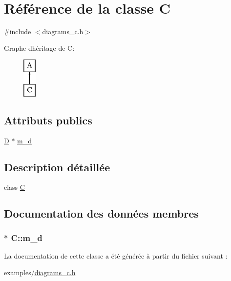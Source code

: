 \hypertarget{class_c}{}\section{Référence de la classe C}
\label{class_c}


{\ttfamily \#include $<$diagrams\+\_\+c.\+h$>$}

Graphe d\textquotesingle{}héritage de C\+:\begin{figure}[H]
\begin{center}
\leavevmode
\includegraphics[height=2.000000cm]{class_c}
\end{center}
\end{figure}
\subsection*{Attributs publics}
\begin{DoxyCompactItemize}
\item 
\hyperlink{class_d}{D} $\ast$ \hyperlink{class_c_a4ef972d28b73ff78eba3ab4f54c3b449}{m\+\_\+d}
\end{DoxyCompactItemize}


\subsection{Description détaillée}
class \hyperlink{class_c}{C} 

\subsection{Documentation des données membres}
\hypertarget{class_c_a4ef972d28b73ff78eba3ab4f54c3b449}{}
\subsubsection[{m\+\_\+d}]{$\ast$ C\+::m\+\_\+d}\label{class_c_a4ef972d28b73ff78eba3ab4f54c3b449}


La documentation de cette classe a été générée à partir du fichier suivant \+:\begin{DoxyCompactItemize}
\item 
examples/\hyperlink{diagrams__c_8h}{diagrams\+\_\+c.\+h}\end{DoxyCompactItemize}
